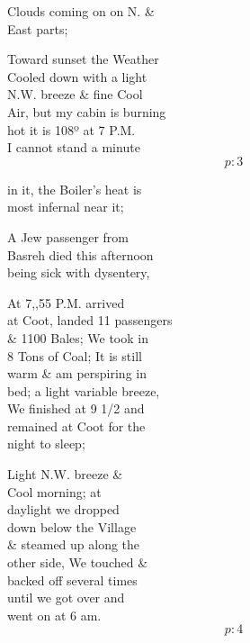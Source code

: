 \documentclass{report}
\begin{document}
	\par{
 	Clouds coming on on N. \&\ \\East parts;\ \\
	}

	\par{
 	Toward sunset the Weather\ \\Cooled down with a light\ \\N.W. breeze \& fine Cool\ \\Air, but my cabin is burning\ \\hot it is 108º at 7 P.M.\ \\I cannot stand a minute\ \\
  \[p: 3 \]

	}



	\par{
 	in it, the Boiler's heat is\ \\most infernal near it;\ \\
	}

	\par{
 	A Jew passenger from\ \\Basreh died this afternoon\ \\being sick with dysentery,\ \\
	}

	\par{
 	At 7,,55 P.M. arrived\ \\at Coot, landed 11 passengers\ \\\& 1100 Bales; We took in\ \\8 Tons of Coal; It is still\ \\warm \& am perspiring in\ \\bed; a light variable breeze,\ \\We finished at 9 1/2 and\ \\remained at Coot for the\ \\night to sleep;\ \\
	}

	\par{
 	Light N.W. breeze \&\ \\Cool morning; at\ \\daylight we dropped\ \\down below the Village\ \\\& steamed up along the\ \\other side, We touched \&\ \\backed off several times\ \\until we got over and\ \\went on at 6 am.\ \\
  \[p: 4 \]

	}
\end{document}
